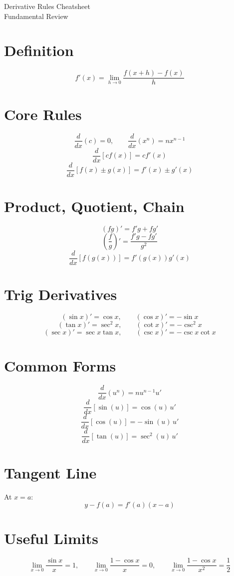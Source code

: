 \documentclass[11pt]{article}
\begin{document}
\begin{center}
{\LARGE Derivative Rules Cheatsheet}\\[0.4em]
{\large Fundamental Review}
\end{center}

\section*{Definition}
\[
f'(x)=\lim_{h\to 0}\frac{f(x+h)-f(x)}{h}
\]

\section*{Core Rules}
\[
\frac{d}{dx}(c)=0,\qquad \frac{d}{dx}(x^n)=nx^{n-1}
\]
\[
\frac{d}{dx}[cf(x)]=cf'(x)
\]
\[
\frac{d}{dx}[f(x)\pm g(x)]=f'(x)\pm g'(x)
\]

\section*{Product, Quotient, Chain}
\[
(fg)'=f'g+fg'
\]
\[
\left(\frac{f}{g}\right)'=\frac{f'g-fg'}{g^2}
\]
\[
\frac{d}{dx}[f(g(x))]=f'(g(x))g'(x)
\]

\section*{Trig Derivatives}
\[
(\sin x)'=\cos x,\qquad (\cos x)'=-\sin x
\]
\[
(\tan x)'=\sec^2 x,\qquad (\cot x)'=-\csc^2 x
\]
\[
(\sec x)'=\sec x\tan x,\qquad (\csc x)'=-\csc x\cot x
\]

\section*{Common Forms}
\[
\frac{d}{dx}(u^n)=nu^{n-1}u'
\]
\[
\frac{d}{dx}[\sin(u)]=\cos(u)\,u'
\]
\[
\frac{d}{dx}[\cos(u)]=-\sin(u)\,u'
\]
\[
\frac{d}{dx}[\tan(u)]=\sec^2(u)\,u'
\]

\section*{Tangent Line}
At $x=a$:
\[
y-f(a)=f'(a)(x-a)
\]

\section*{Useful Limits}
\[
\lim_{x\to 0}\frac{\sin x}{x}=1,\qquad
\lim_{x\to 0}\frac{1-\cos x}{x}=0,\qquad
\lim_{x\to 0}\frac{1-\cos x}{x^2}=\frac12
\]
\end{document}
